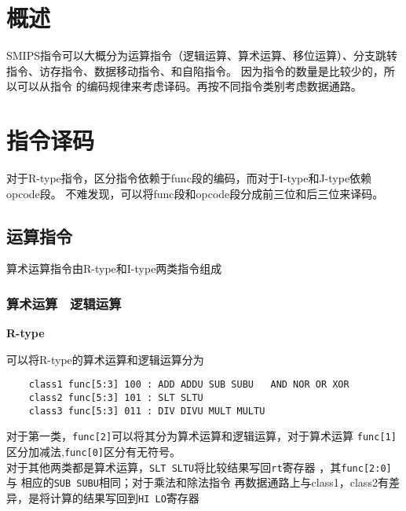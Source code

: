\documentclass[UTF8]{ctexart}
\begin{document}


\section{概述} \label{overview}%
SMIPS指令可以大概分为运算指令（逻辑运算、算术运算、移位运算）、分支跳转指令、访存指令、数据移动指令、和自陷指令。
因为指令的数量是比较少的，所以可以从指令
的编码规律来考虑译码。再按不同指令类别考虑数据通路。

\newpage
\section{指令译码} \label{sysdes}%
对于R-type指令，区分指令依赖于func段的编码，而对于I-type和J-type依赖opcode段。
不难发现，可以将func段和opcode段分成前三位和后三位来译码。
\subsection{运算指令}\label{sub:sysover}
算术运算指令由R-type和I-type两类指令组成
\subsubsection{算术运算 \ 逻辑运算}\label{sub:Interface}

\textbf{R-type}

可以将R-type的算术运算和逻辑运算分为

\begin{verbatim}
    class1 func[5:3] 100 : ADD ADDU SUB SUBU   AND NOR OR XOR
    class2 func[5:3] 101 : SLT SLTU
    class3 func[5:3] 011 : DIV DIVU MULT MULTU 
\end{verbatim}

对于第一类，\texttt{func[2]}可以将其分为算术运算和逻辑运算，对于算术运算
\texttt{func[1]}区分加减法,\texttt{func[0]}区分有无符号。
\\

对于其他两类都是算术运算，\texttt{SLT SLTU}将比较结果写回\texttt{rt}寄存器
，其\texttt{func[2:0]}与
相应的\texttt{SUB SUBU}相同；对于乘法和除法指令
再数据通路上与class1，class2有差异，是将计算的结果写回到\texttt{HI LO}寄存器
\\
\end{document}
